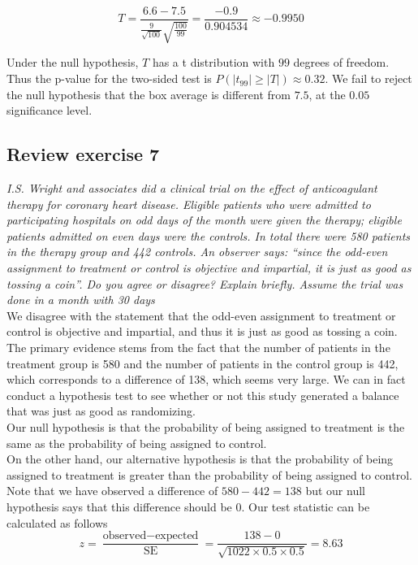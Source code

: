 \documentclass[11pt]{article}
\begin{document}
$$T= \frac{6.6-7.5}{\frac{9}{\sqrt{100}}\sqrt{\frac{100}{99}}} = \frac{-0.9}{0.904534} \approx -0.9950$$

Under the null hypothesis, $T$ has a t distribution with $99$ degrees of freedom.  Thus the p-value for the two-sided test is $ P(\lvert t_{99} \rvert \geq \lvert T\rvert ) \approx 0.32$.  We fail to reject the null hypothesis that the box average is different from $7.5$, at the $0.05$ significance level.



\subsection*{Review exercise 7} %
\noindent \emph{I.S. Wright and associates did a clinical trial on the effect of anticoagulant therapy for coronary heart disease. Eligible patients who were admitted to participating hospitals on odd days of the month were given the therapy; eligible patients admitted on even days were the controls. In total there were 580 patients in the therapy group and 442 controls. An observer says: ``since the odd-even assignment to treatment or control is objective and impartial, it is just as good as tossing a coin''. Do you agree or disagree? Explain briefly. Assume the trial was done in a month with 30 days}\\

\noindent We disagree with the statement that the odd-even assignment to treatment or control is objective and impartial, and thus it is just as good as tossing a coin. The primary evidence stems from the fact that the number of patients  in the treatment group is 580 and the number of patients in the control group is 442, which corresponds to a difference of 138, which seems very large. We can in fact conduct a hypothesis test to see whether or not this study generated a balance that was just as good as randomizing.\\

\noindent Our null hypothesis is that the probability of being assigned to treatment is the same as the probability of being assigned to control. \\

\noindent On the other hand, our alternative hypothesis is that the probability of being assigned to treatment is greater than the probability of being assigned to control. Note that we have observed a difference of $580 - 442 = 138$ but our null hypothesis says that this difference should be 0. Our test statistic can be calculated as follows
$$z = \frac{\text{observed} - \text{expected}}{\text{SE}} = \frac{138 - 0}{\sqrt{1022 \times 0.5 \times 0.5}} = 8.63 $$
\end{document}

